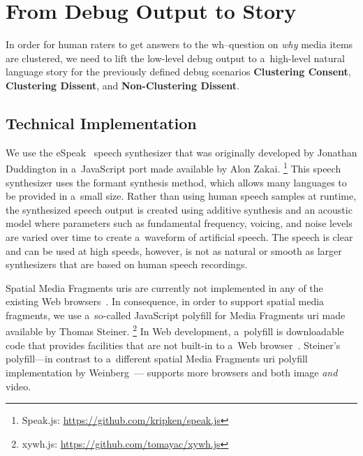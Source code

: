 \documentclass{article}
\begin{document}
\section{From Debug Output to Story}
\label{sec:from-debug-output-to-story}

In order for human raters to get answers to the wh--question
on \emph{why} media items are clustered,
we need to lift the low-level debug output
to a~high-level natural language story
for the previously defined debug scenarios
\textbf{Clustering Consent}, \textbf{Clustering Dissent},
and \textbf{Non-Clustering Dissent}.

\subsection{Technical Implementation}

We use the eSpeak~\cite{duddington2012espeak}
speech synthesizer that was originally developed by Jonathan Duddington
in a~JavaScript port made available by Alon Zakai.%
\footnote{Speak.js: \url{https://github.com/kripken/speak.js}}
This speech synthesizer uses the formant synthesis method,
which allows many languages to be provided in a~small size.
Rather than using human speech samples at runtime,
the synthesized speech output is created using additive synthesis and an acoustic model
where parameters such as fundamental frequency, voicing, and noise levels
are varied over time to create a~waveform of artificial speech. 
The speech is clear and can be used at high speeds,
however, is not as natural or smooth as larger synthesizers
that are based on human speech recordings.

Spatial Media Fragments {\sc uri}s are currently not implemented
in any of the existing Web browsers~\cite{weinberg2013polyfill}.
In consequence, in order to support spatial media fragments,
we use a~so-called JavaScript polyfill for Media Fragments {\sc uri}
made available by Thomas Steiner.%
\footnote{xywh.js: \url{https://github.com/tomayac/xywh.js}}
In Web development, a~polyfill is downloadable code
that provides facilities that are not built-in to a~Web browser~\cite{sharp2010polyfill}.
Steiner's polyfill---in contrast to a~different spatial Media Fragments {\sc uri}
polyfill implementation by Weinberg~\cite{weinberg2013polyfill}---%
supports more browsers and both image \emph{and} video.
\end{document}
